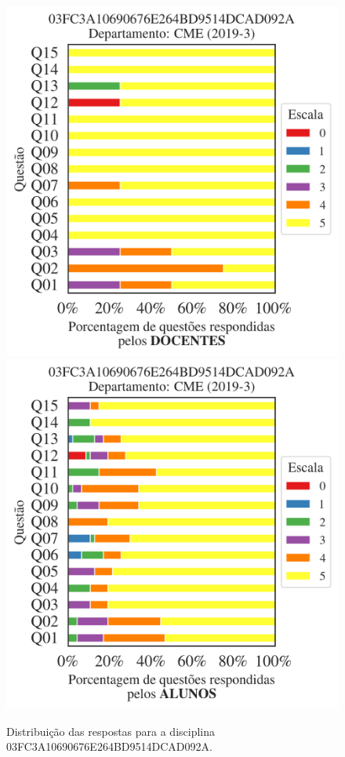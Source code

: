 \documentclass[a4paper,10pt]{article}
\begin{document}
\begin{figure}[h]
\centering
\includegraphics[width=0.485\linewidth]{analise_disciplina_departamento_CME_03FC3A10690676E264BD9514DCAD092A_docentes.png}
\includegraphics[width=0.485\linewidth]{analise_disciplina_departamento_CME_03FC3A10690676E264BD9514DCAD092A_alunos.png}
\caption{\label{fig:analise_geral_departamento}                Distribuição das respostas para a disciplina 03FC3A10690676E264BD9514DCAD092A. }
\end{figure}
\end{document}

